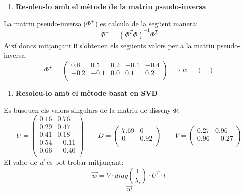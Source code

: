 \documentclass[a4paper]{article}
\begin{document}
\begin{enumerate}[resume]
	\item \textbf{Resoleu-lo amb el mètode de la matriu pseudo-inversa}
\end{enumerate}
La matriu pseudo-inversa ($\Phi^+$) es calcula de la següent manera:
$$
\Phi^+ = (\Phi^T\Phi)^{-1}\Phi^T
$$
Així doncs mitjançant \texttt{R} s'obtenen els següents valors per a la matriu pseudo-inversa:
$$
\Phi^+ =
\begin{pmatrix}
0.8 & 0.5 & 0.2 & -0.1 & -0.4\\
-0.2 & -0.1 & 0.0 & 0.1 & 0.2\\
\end{pmatrix}
\implies 
w = 
\begin{pmatrix}

\end{pmatrix}
$$

\begin{enumerate}[resume]
	\item \textbf{Resoleu-lo amb el mètode basat en SVD}
\end{enumerate}

Es busquen els valors singulars de la matriu de disseny $\Phi$.
$$
U = 
\begin{pmatrix}
0.16 & 0.76 \\
0.29 & 0.47 \\
0.41 & 0.18 \\
0.54 & -0.11 \\
0.66 & -0.40 \\
\end{pmatrix}
\qquad
D =
\begin{pmatrix}
7.69 & 0 \\
0 & 0.92 \\
\end{pmatrix}
\qquad
V = 
\begin{pmatrix}
0.27 & 0.96 \\
0.96 & -0.27 \\
\end{pmatrix}
$$
El valor de $\vec{w}$ es pot trobar mitjançant:
$$
\vec{w} = V·diag\left(\frac{1}{\lambda_i}\right)·U^T·t
$$
$$
\vec{w}
$$
\end{document}
